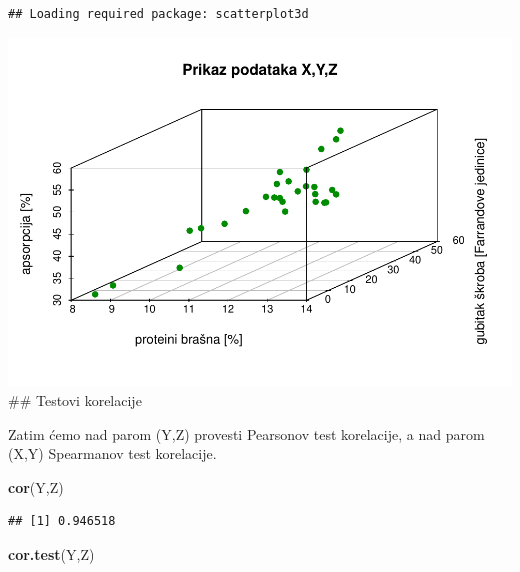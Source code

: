 \documentclass[]{article}
\newenvironment{Shaded}{\begin{snugshade}}{\end{snugshade}}
\newcommand{\KeywordTok}[1]{\textcolor[rgb]{0.13,0.29,0.53}{\textbf{{#1}}}}
\newcommand{\DataTypeTok}[1]{\textcolor[rgb]{0.13,0.29,0.53}{{#1}}}
\newcommand{\DecValTok}[1]{\textcolor[rgb]{0.00,0.00,0.81}{{#1}}}
\newcommand{\StringTok}[1]{\textcolor[rgb]{0.31,0.60,0.02}{{#1}}}
\newcommand{\NormalTok}[1]{{#1}}
\begin{document}
\begin{verbatim}
## Loading required package: scatterplot3d
\end{verbatim}

\begin{Shaded}
\end{Shaded}

\includegraphics{Izvjestaj_files/figure-latex/unnamed-chunk-24-4.pdf}
\#\# Testovi korelacije

Zatim ćemo nad parom (Y,Z) provesti Pearsonov test korelacije, a nad
parom (X,Y) Spearmanov test korelacije.

\begin{Shaded}
\begin{Highlighting}[]
\KeywordTok{cor}\NormalTok{(Y,Z)}
\end{Highlighting}
\end{Shaded}

\begin{verbatim}
## [1] 0.946518
\end{verbatim}

\begin{Shaded}
\begin{Highlighting}[]
\KeywordTok{cor.test}\NormalTok{(Y,Z)}
\end{Highlighting}
\end{Shaded}
\end{document}
